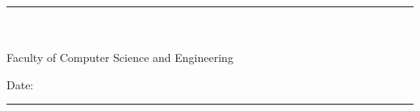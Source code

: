 \clearpage
\thispagestyle{empty}

\vspace*{6cm}

\noindent
\begin{minipage}[t]{0.52\textwidth}
  \rule{0.78\textwidth}{0.8pt}\\[2pt]
  \InstructorName\\
  Faculty of Computer Science and Engineering
\end{minipage}%
\hfill
\begin{minipage}[t]{0.40\textwidth}
  \raggedleft
  Date: \rule{3.2cm}{0.8pt}
\end{minipage}

\vfill
